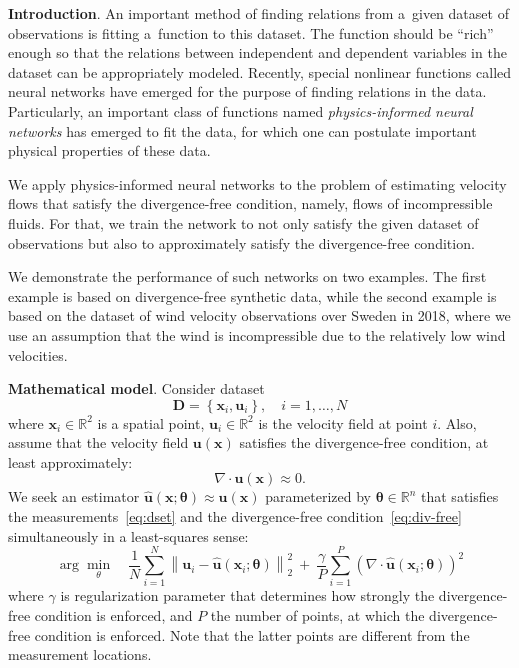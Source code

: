 \documentclass[pamm,a4paper,fleqn]{w-art}
\renewcommand{\vec}[1]{\boldsymbol{#1}}
\newcommand{\R}{\mathbb R}
\newcommand{\norm}[1]{\left\lVert#1\right\rVert}
\begin{document}
\textbf{Introduction}.
An important method of finding relations from a~given dataset of observations
is fitting a~function to this dataset.
The function should be ``rich'' enough so that the relations between independent
and dependent variables in the dataset can be appropriately modeled.
Recently, special nonlinear functions called neural networks have emerged for
the purpose of finding relations in the data. Particularly, an important class
of functions named \emph{physics-informed neural networks} \cite{RaissiEtAl2019}
has emerged to fit the data, for which one can postulate
important physical properties of these data.

We apply physics-informed neural networks to the problem of estimating velocity
flows that satisfy the divergence-free condition, namely, flows of
incompressible fluids.
For that, we train the network to not only satisfy the given dataset of
observations but also to approximately satisfy the divergence-free condition.

We demonstrate the performance of such networks on two examples.
The first example is based on divergence-free synthetic data, while
the second example is based on the dataset of wind velocity observations over
Sweden in 2018, where we use an assumption that the wind is incompressible due
to the relatively low wind velocities.

\textbf{Mathematical model}.
Consider dataset
\begin{equation}
  \label{eq:dset}
  \vec{D} = \left\{\vec{x}_i, \vec{u}_i\right\}, \quad i = 1, \dots, N
\end{equation}
where $\vec{x}_i \in \R^2$ is a spatial point,
$\vec{u}_i  \in \R^2$ is the velocity field at point $i$.
Also, assume that the velocity field $\vec u (\vec x)$ satisfies the
divergence-free condition, at least approximately:
\begin{equation}
  \label{eq:div-free}
  \nabla \cdot \vec u (\vec x) \approx 0.
\end{equation}
We seek an estimator $\hat{\vec u} (\vec x; \vec \theta)\approx \vec u(\vec x)$
parameterized by $\vec \theta \in \R^n$ that satisfies
the measurements~\eqref{eq:dset} and the divergence-free
condition~\eqref{eq:div-free} simultaneously in a least-squares sense:
\begin{equation}
  \label{eq:opt-problem}
  \arg \min_\theta \quad
  \frac{1}{N} \sum_{i=1}^N \norm{\vec u_i - \hat{\vec u}(\vec x_i; \vec\theta)}^2_2
  \ + \ 
  \frac{\gamma}{P} \sum_{i=1}^P \left( \nabla \cdot \hat{\vec u}(\vec x_i; \vec\theta)\right)^2
\end{equation}
where 
$\gamma$ is regularization parameter that determines how strongly
the divergence-free condition is enforced,
and $P$ the number of points, at which the divergence-free condition is
enforced. Note that the latter points are different
from the measurement locations.
\end{document}
